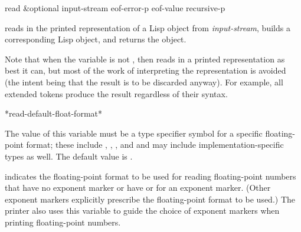 \begin{defun}[Function]
read &optional input-stream eof-error-p eof-value recursive-p

 reads in the printed representation of a Lisp object
from {\it input-stream}, builds a corresponding Lisp object, and returns
the object.

Note that when the variable  is not {\nil},
then  reads in a printed representation as best it can,
but most of the work of interpreting the representation is avoided
(the intent being that the result is to be discarded anyway).
For example, all extended tokens produce the result {\nil} regardless
of their syntax.
\end{defun}

\begin{defun}[Variable]
*read-default-float-format*

The value of this variable must be a type specifier symbol for
a specific floating-point format; these include
, ,
, and  and may include implementation-specific
types as well.  The default value is .

indicates the floating-point format to be used
for reading floating-point numbers that have no exponent marker or have
 or  for an exponent marker.  (Other exponent markers
explicitly prescribe the floating-point format to be used.)
The printer also uses this variable to guide the choice of exponent
markers when printing floating-point numbers.
\end{defun}

